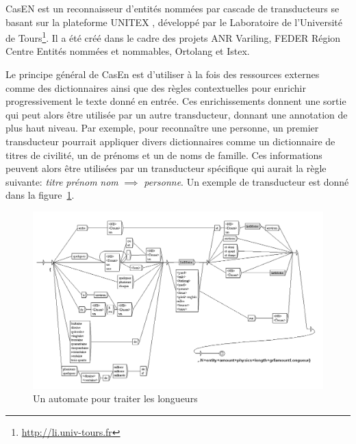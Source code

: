 \documentclass[PhD-Yoann-Dupont.tex]{subfiles}
\begin{document}
CasEN \citep{nouvel2010reconnaissance} est un reconnaisseur d'entités nommées par cascade de transducteurs se basant sur la plateforme UNITEX \cite{paumier2011unitex}, développé par le Laboratoire de l'Université de Tours\footnote{\url{http://li.univ-tours.fr}}. Il a été créé dans le cadre des projets ANR Variling, FEDER Région Centre Entités nommées et nommables, Ortolang et Istex.

Le principe général de CasEn est d'utiliser à la fois des ressources externes comme des dictionnaires ainsi que des règles contextuelles pour enrichir progressivement le texte donné en entrée. Ces enrichissements donnent une sortie qui peut alors être utilisée par un autre transducteur, donnant une annotation de plus haut niveau. Par exemple, pour reconnaître une personne, un premier transducteur pourrait appliquer divers dictionnaires comme un dictionnaire de titres de civilité, un de prénoms et un de noms de famille. Ces informations peuvent alors être utilisées par un transducteur spécifique qui aurait la règle suivante: \emph{titre} \emph{prénom} \emph{nom} $\implies$ \emph{personne}. Un exemple de transducteur est donné dans la figure\ \ref{fig:casen-longueur}.

\begin{figure}[ht!]
    \centering
    \includegraphics[scale=0.5]{images/CasEN/longueurs}
    \caption{Un automate pour traiter les longueurs}
    \label{fig:casen-longueur}
\end{figure}
\end{document}
